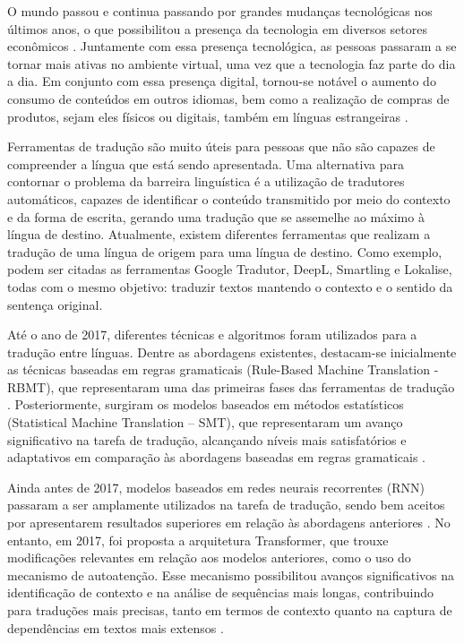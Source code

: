 

O mundo passou e continua passando por grandes mudanças tecnológicas nos últimos anos, o que possibilitou a presença da tecnologia em diversos setores econômicos \cite{del2009avancco}. Juntamente com essa presença tecnológica, as pessoas passaram a se tornar mais ativas no ambiente virtual, uma vez que a tecnologia faz parte do dia a dia. Em conjunto com essa presença digital, tornou-se notável o aumento do consumo de conteúdos em outros idiomas, bem como a realização de compras de produtos, sejam eles físicos ou digitais, também em línguas estrangeiras \cite{bulla2024forbes}.

Ferramentas de tradução são muito úteis para pessoas que não são capazes de compreender a língua que está sendo apresentada. Uma alternativa para contornar o problema da barreira linguística é a utilização de tradutores automáticos, capazes de identificar o conteúdo transmitido por meio do contexto e da forma de escrita, gerando uma tradução que se assemelhe ao máximo à língua de destino. Atualmente, existem diferentes ferramentas que realizam a tradução de uma língua de origem para uma língua de destino. Como exemplo, podem ser citadas as ferramentas Google Tradutor, DeepL, Smartling e Lokalise, todas com o mesmo objetivo: traduzir textos mantendo o contexto e o sentido da sentença original.

Até o ano de 2017, diferentes técnicas e algoritmos foram utilizados para a tradução entre línguas. Dentre as abordagens existentes, destacam-se inicialmente as técnicas baseadas em regras gramaticais (Rule-Based Machine Translation - RBMT), que representaram uma das primeiras fases das ferramentas de tradução \cite{torregrosa2019leveraging}. Posteriormente, surgiram os modelos baseados em métodos estatísticos (Statistical Machine Translation – SMT), que representaram um avanço significativo na tarefa de tradução, alcançando níveis mais satisfatórios e adaptativos em comparação às abordagens baseadas em regras gramaticais \cite{10.1145/1380584.1380586}.

Ainda antes de 2017, modelos baseados em redes neurais recorrentes (RNN) passaram a ser amplamente utilizados na tarefa de tradução, sendo bem aceitos por apresentarem resultados superiores em relação às abordagens anteriores \cite{dang2023languagemodel}. No entanto, em 2017, foi proposta a arquitetura Transformer, que trouxe modificações relevantes em relação aos modelos anteriores, como o uso do mecanismo de autoatenção. Esse mecanismo possibilitou avanços significativos na identificação de contexto e na análise de sequências mais longas, contribuindo para traduções mais precisas, tanto em termos de contexto quanto na captura de dependências em textos mais extensos \cite{anand2025whytransformers}.


